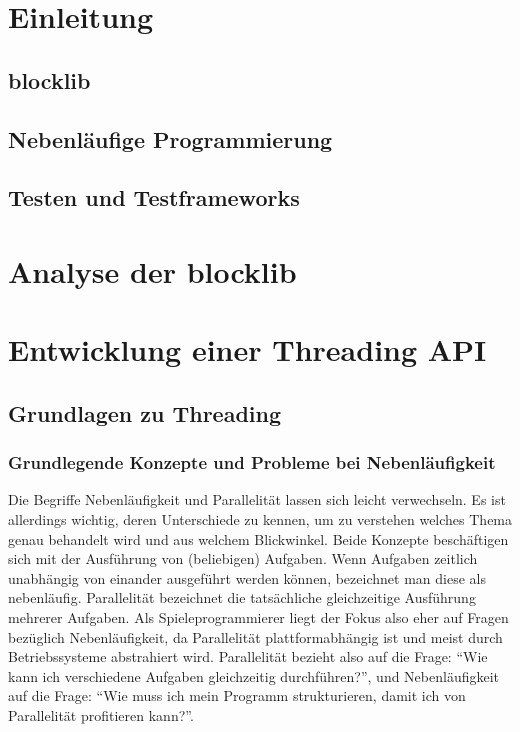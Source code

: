 \documentclass[12pt,a4paper,listof=totocnumbered,parskip=half]{scrreprt}
\begin{document}

\null\thispagestyle{empty}\clearpage
\tableofcontents
\chapter{Einleitung}
\section{blocklib}
\section{Nebenläufige Programmierung}
\section{Testen und Testframeworks}

\chapter{Analyse der blocklib}


\chapter{Entwicklung einer Threading API}

\section{Grundlagen zu Threading}
\subsection{Grundlegende Konzepte und Probleme bei Nebenläufigkeit}
Die Begriffe Nebenläufigkeit und Parallelität lassen sich leicht verwechseln. Es ist allerdings wichtig, deren Unterschiede zu kennen, um zu verstehen welches Thema genau behandelt wird und aus welchem Blickwinkel. Beide Konzepte beschäftigen sich mit der Ausführung von (beliebigen) Aufgaben. Wenn Aufgaben zeitlich unabhängig von einander ausgeführt werden können, bezeichnet man diese als nebenläufig. Parallelität bezeichnet die tatsächliche gleichzeitige Ausführung mehrerer Aufgaben. Als Spieleprogrammierer liegt der Fokus also eher auf Fragen bezüglich Nebenläufigkeit, da Parallelität plattformabhängig ist und meist durch Betriebssysteme abstrahiert wird. Parallelität bezieht also auf die Frage: \enquote{Wie kann ich verschiedene Aufgaben gleichzeitig durchführen?}, und Nebenläufigkeit auf die Frage: \enquote{Wie muss ich mein Programm strukturieren, damit ich von Parallelität profitieren kann?}. 
\end{document}
